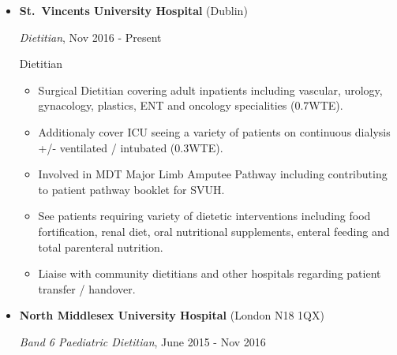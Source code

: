 \documentclass[]{article}
\providecommand{\tightlist}{%
  \setlength{\itemsep}{0pt}\setlength{\parskip}{0pt}}
\begin{document}
\begin{itemize}
\item
  \textbf{St.~Vincents University Hospital} (Dublin)

  \emph{Dietitian}, Nov 2016 - Present

  Dietitian

  \begin{itemize}
  \tightlist
  \item
    Surgical Dietitian covering adult inpatients including vascular,
    urology, gynacology, plastics, ENT and oncology specialities
    (0.7WTE).
  \item
    Additionaly cover ICU seeing a variety of patients on continuous
    dialysis +/- ventilated / intubated (0.3WTE).
  \item
    Involved in MDT Major Limb Amputee Pathway including contributing to
    patient pathway booklet for SVUH.
  \item
    See patients requiring variety of dietetic interventions including
    food fortification, renal diet, oral nutritional supplements,
    enteral feeding and total parenteral nutrition.
  \item
    Liaise with community dietitians and other hospitals regarding
    patient transfer / handover.
  \end{itemize}
\item
  \textbf{North Middlesex University Hospital} (London N18 1QX)

  \emph{Band 6 Paediatric Dietitian}, June 2015 - Nov 2016


\end{itemize}
\end{document}
